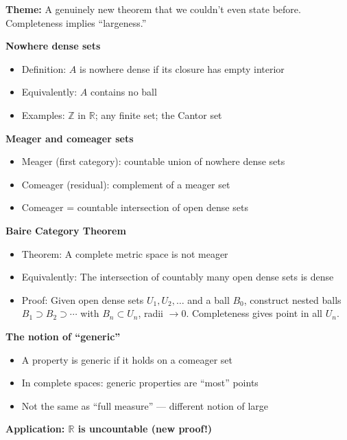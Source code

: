 \documentclass[
  10pt,
  letterpaper,
]{scrbook}
\providecommand{\tightlist}{%
  \setlength{\itemsep}{0pt}\setlength{\parskip}{0pt}}
\begin{document}
\textbf{Theme:} A genuinely new theorem that we couldn't even state
before. Completeness implies ``largeness.''

\textbf{Nowhere dense sets}

\begin{itemize}
\tightlist
\item
  Definition: \(A\) is nowhere dense if its closure has empty interior
\item
  Equivalently: \(A\) contains no ball
\item
  Examples: \(\mathbb{Z}\) in \(\mathbb{R}\); any finite set; the Cantor
  set
\end{itemize}

\textbf{Meager and comeager sets}

\begin{itemize}
\tightlist
\item
  Meager (first category): countable union of nowhere dense sets
\item
  Comeager (residual): complement of a meager set
\item
  Comeager = countable intersection of open dense sets
\end{itemize}

\textbf{Baire Category Theorem}

\begin{itemize}
\tightlist
\item
  Theorem: A complete metric space is not meager
\item
  Equivalently: The intersection of countably many open dense sets is
  dense
\item
  Proof: Given open dense sets \(U_1, U_2, \ldots\) and a ball \(B_0\),
  construct nested balls \(B_1 \supset B_2 \supset \cdots\) with
  \(B_n \subset U_n\), radii \(\to 0\). Completeness gives point in all
  \(U_n\).
\end{itemize}

\textbf{The notion of ``generic''}

\begin{itemize}
\tightlist
\item
  A property is generic if it holds on a comeager set
\item
  In complete spaces: generic properties are ``most'' points
\item
  Not the same as ``full measure'' --- different notion of large
\end{itemize}

\textbf{Application: \(\mathbb{R}\) is uncountable (new proof!)}
\end{document}
